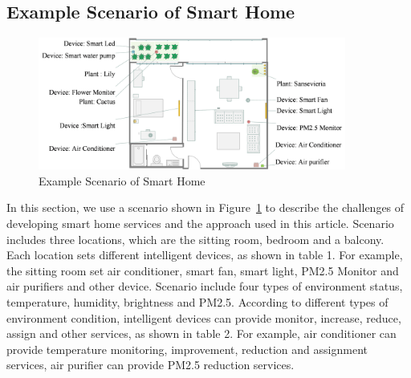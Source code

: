 
\subsection{Example Scenario of Smart Home}
\begin{figure}
	\centering
    \includegraphics[width=0.9\textwidth]{scenario.png}
	\caption{Example Scenario of Smart Home}
	\label{fig:scenario}
\end{figure}

In this section, we use a scenario shown in Figure~\ref{fig:scenario} to describe the challenges of developing smart home services and the approach used in this article. Scenario includes three locations, which are the sitting room, bedroom and a balcony. Each location sets different intelligent devices, as shown in table 1. For example, the sitting room set air conditioner, smart fan, smart light, PM2.5 Monitor and air purifiers and other device. Scenario include four types of environment status, temperature, humidity, brightness and PM2.5. According to different types of environment condition, intelligent devices can provide monitor, increase, reduce, assign and other services, as shown in table 2. For example, air conditioner can provide temperature monitoring, improvement, reduction and assignment services, air purifier can provide PM2.5 reduction services.

